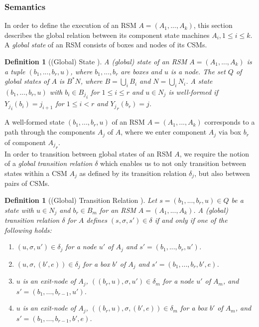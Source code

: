 \documentclass[a4paper, 12pt, twoside]{report}
\theoremstyle{plain}
\newtheorem{definition}[theorem]{Definition}
\begin{document}
	\subsubsection{Semantics}
	In order to define the execution of an RSM $A=(A_1, ..., A_k)$, this section describes the global relation between its component state machines $A_i, 1 \leq i \leq k$. A \textit{global state} of an RSM consists of boxes and nodes of its CSMs.
	
	\begin{definition}[(Global) State \cite{alur2001analysis}]\label{def:rsm_semantics}
		A \textup{(global) state} of an RSM $A=(A_1, ..., A_k)$ is a tuple $(b_1, ..., b_r, u)$, where $b_1, ..., b_r$ are boxes and $u$ is a node. The set $Q$ of global states of $A$ is $B^*N$, where $B=\bigcup_iB_i$ and $N=\bigcup_iN_i$. A state $(b_1, ..., b_r, u)$ with $b_i \in {B_j}_i$ for $1 \leq i \leq r$ and $u \in N_j$ is \textup{well-formed} if ${Y_j}_i(b_i) = j_{i+1}$ for $1 \leq i < r$ and ${Y_j}_r(b_r) = j$.
	\end{definition}
	
	
	A well-formed state $(b_1, ..., b_r, u)$ of an RSM $A=(A_1, ..., A_k)$ corresponds to a path through the components $A_j$ of $A$, where we enter component $A_j$ via box $b_r$ of component ${A_j}_r$.\\
	
	
	In order to transition between global states of an RSM $A$, we require the notion of a \textit{global transition relation} $\delta$ which enables us to not only transition between states within a CSM $A_j$ as defined by its transition relation $\delta_j$, but also between pairs of CSMs.
	
	\begin{definition}[(Global) Transition Relation \cite{alur2001analysis}]\label{def:rsm_transitionRelation}
		Let $s=(b_1, ..., b_r, u) \in Q$ be a state with $u\in N_j$ and $b_r \in B_m$ for an RSM $A=(A_1, ..., A_k)$. A \textup{(global) transition relation} $\delta$ for $A$ defines $(s, \sigma, s') \in \delta$ if and only if one of the following holds:
		\begin{enumerate}
			\item $(u, \sigma, u') \in \delta_j$ for a node $u'$ of $A_j$ and $s'=(b_1, ..., b_r, u')$.
			\item $(u, \sigma, (b',e))\in \delta_j$ for a box $b'$ of $A_j$ and $s'=(b_1, ..., b_r, b', e)$.
			\item $u$ is an exit-node of $A_j$, $((b_r, u), \sigma, u') \in \delta_m$ for a node $u'$ of $A_m$, and $s'=(b_1, ..., b_{r-1}, u')$.
			\item $u$ is an exit-node of $A_j$, $((b_r, u), \sigma, (b',e)) \in \delta_m$ for a box $b'$ of $A_m$, and $s'=(b_1, ..., b_{r-1}, b', e)$.
		\end{enumerate}
	\end{definition}
	
\end{document}

